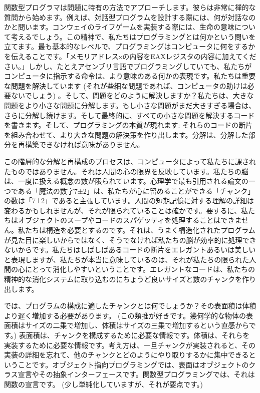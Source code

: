 関数型プログラマは問題に特有の方法でアプローチします。彼らは非常に禅的な質問から始めます。例えば、対話型プログラムを設計する際には、何が対話なのかと問います。コンウェイのライフゲームを実装する際には、生命の意味について考えるでしょう。この精神で、私たちはプログラミングとは何かという問いを立てます。最も基本的なレベルで、プログラミングはコンピュータに何をするかを伝えることです。「メモリアドレスxの内容をEAXレジスタの内容に加えてください。」しかし、たとえアセンブリ言語でプログラミングしていても、私たちがコンピュータに指示する命令は、より意味のある何かの表現です。私たちは重要な問題を解決しています (それが些細な問題であれば、コンピュータの助けは必要ないでしょう) 。そして、問題をどのように解決しますか？私たちは、大きな問題をより小さな問題に分解します。もし小さな問題がまだ大きすぎる場合は、さらに分解し続けます。そして最終的に、すべての小さな問題を解決するコードを書きます。そして、プログラミングの本質が現れます: それらのコードの断片を組み合わせて、より大きな問題の解決策を作り出します。分解は、分解した部分を再構築できなければ意味がありません。

この階層的な分解と再構成のプロセスは、コンピュータによって私たちに課されたものではありません。それは人間の心の限界を反映しています。私たちの脳は、一度に扱える概念の数が限られています。心理学で最も引用される論文の一つである「魔法の数字7±2」は、私たちが心に留めることができる「チャンク」の数は「7±2」であると主張しています。人間の短期記憶に対する理解の詳細は変わるかもしれませんが、それが限られていることは確かです。要するに、私たちはオブジェクトのスープやコードのスパゲッティを処理することはできません。私たちは構造を必要とするのです。それは、うまく構造化されたプログラムが見た目に楽しいからではなく、そうでなければ私たちの脳が効率的に処理できないからです。私たちはしばしばあるコードの断片をエレガントあるいは美しいと表現しますが、私たちが本当に意味しているのは、それが私たちの限られた人間の心にとって消化しやすいということです。エレガントなコードは、私たちの精神的な消化システムに取り込むのにちょうど良いサイズと数のチャンクを作り出します。

では、プログラムの構成に適したチャンクとは何でしょうか？その表面積は体積より遅く増加する必要があります。 (この類推が好きです。幾何学的な物体の表面積はサイズの二乗で増加し、体積はサイズの三乗で増加するという直感からです。) 表面積は、チャンクを構成するために必要な情報です。体積は、それらを実装するために必要な情報です。考え方は、一旦チャンクが実装されると、その実装の詳細を忘れて、他のチャンクとどのようにやり取りするかに集中できるということです。オブジェクト指向プログラミングでは、表面はオブジェクトのクラス宣言やその抽象インターフェースです。関数型プログラミングでは、それは関数の宣言です。 (少し単純化していますが、それが要点です。) 

